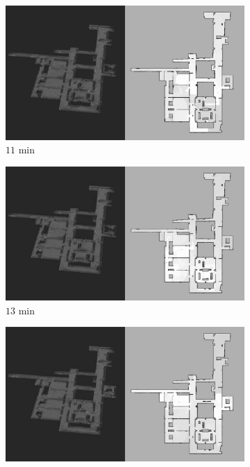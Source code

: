 \documentclass[smallextended]{svjour3}       %
\begin{document}
\begin{figure}[!t]
\begin{subfigure}[t]{0.38\columnwidth}
          	\includegraphics[trim={0cm 0cm 35cm 0cm}, clip, width=\textwidth]{Patrol_Split_Screen_11min.jpg}
        		\caption{$11$ min}
		\vspace*{0.05\textwidth}
    	\end{subfigure}
    	\begin{subfigure}[t]{0.38\columnwidth}
           	\centering
          	\includegraphics[trim={0cm 0cm 35cm 0cm}, clip, width=\textwidth]{Patrol_Split_Screen_13min.jpg}
        		\caption{$13$ min}
		\vspace*{0.05\textwidth}
    	\end{subfigure}
	\hspace*{0.05\textwidth}
    	\begin{subfigure}[t]{0.38\columnwidth}
           	\centering
          	\includegraphics[trim={0cm 0cm 35cm 0cm}, clip, width=\textwidth]{Patrol_Split_Screen_15min.jpg}

\end{subfigure}
\end{figure}
\end{document}
